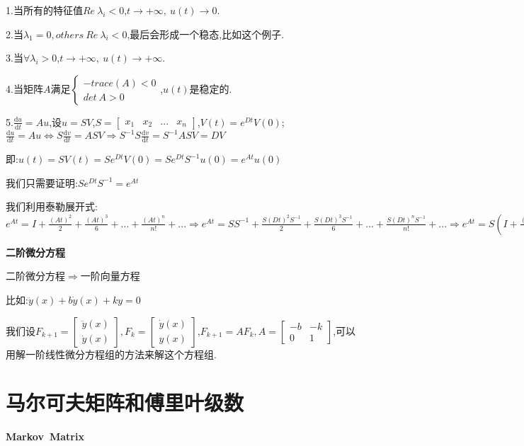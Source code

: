 \documentclass[oneside]{book}
\begin{document}
1.当所有的特征值$Re\ \lambda_{i}<0$,$t\rightarrow +\infty ,\ u(t)\rightarrow 0$.

2.当$\lambda_{1}=0,others\ Re\ \lambda_{i}<0$,最后会形成一个稳态,比如这个例子.

3.当$\forall \lambda_{i}>0 $,$t\rightarrow +\infty ,\ u(t)\rightarrow +\infty$.

4.当矩阵$A$满足$\left\{\begin{array}{c}
	-trace(A)<0\\det\ A>0
\end{array}\right.$,$u(t)$是稳定的.

5.$\frac{\mathrm{d}u}{\mathrm{d}t}=Au$,设$u=SV$,$S=\left[\begin{array}{cccc}
	x_{1}&x_{2}&...&x_{n}
\end{array}\right]$,$V(t)=\textit{e}^{Dt}V(0)$;$\frac{\mathrm{d}u}{\mathrm{d}t}=Au\Leftrightarrow S\frac{\mathrm{d}v}{\mathrm{d}t}=ASV \Rightarrow S^{-1}S\frac{\mathrm{d}v}{\mathrm{d}t}=S^{-1}ASV=DV$

即:$u(t)=SV(t)=S\textit{e}^{Dt}V(0)=S\textit{e}^{Dt}S^{-1}u(0)=\textit{e}^{At}u(0)$

我们只需要证明:$S\textit{e}^{Dt}S^{-1}=\textit{e}^{At}$

我们利用泰勒展开式:$\textit{e}^{At}=I+\frac{(At)^{2}}{2}+\frac{(At)^{3}}{6}+...+\frac{(At)^{n}}{n!}+...\Rightarrow \textit{e}^{At}=SS^{-1}+\frac{S(Dt)^{2}S^{-1}}{2}+\frac{S(Dt)^{3}S^{-1}}{6}+...+\frac{S(Dt)^{n}S^{-1}}{n!}+...\Rightarrow \textit{e}^{At}=S(I+\frac{(Dt)^{2}}{2}+\frac{(Dt)^{3}}{6}+...+\frac{(Dt)^{n}}{n!}+...)S^{-1}\Rightarrow \textit{e}^{At}=S\textit{e}^{Dt}S^{-1}$
	
	\textbf{二阶微分方程}
	
	二阶微分方程$\Rightarrow$一阶向量方程
	
	比如:$\ddot{y}(x)+b\dot{y}(x)+ky=0$
	
	我们设$F_{k+1}=\left[\begin{array}{c}
		\ddot{y}(x)\\\dot{y}(x)
	\end{array}\right],F_{k}=\left[\begin{array}{c}
	\dot{y}(x)\\y(x)
\end{array}\right]$,$F_{k+1}=AF_{k},A=\left[\begin{array}{cc}
-b&-k\\0&1
\end{array}\right]$,可以用解一阶线性微分方程组的方法来解这个方程组.
	
	\chapter{马尔可夫矩阵和傅里叶级数}
	\textbf{Markov\ Matrix}
	
\end{document}
